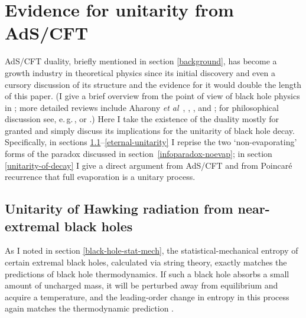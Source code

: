 \documentclass[12pt]{article}
\newcommand{\egc}{\mbox{e.\,g.\,}}
\begin{document}
\section{Evidence for unitarity from AdS/CFT}\label{adscft}

AdS/CFT duality, briefly mentioned in section \ref{background}, has become a growth industry in theoretical physics since its initial discovery and even a cursory discussion of its structure and the evidence for it would double the length of this paper. (I give a brief overview from the point of view of black hole physics in ; more detailed reviews include Aharony \emph{et al}~\citeyear{aharonyadscftreview}, , , and ; for philosophical discussion see, \egc,  or .) Here I take the existence of the duality mostly for granted and simply discuss its implications for the unitarity of black hole decay. Specifically, in sections \ref{near-extremal-unitarity}--\ref{eternal-unitarity} I reprise the two `non-evaporating' forms of the paradox discussed in section~\ref{infoparadox-noevap}; in section \ref{unitarity-of-decay} I give a direct argument from AdS/CFT and from Poincar\'{e} recurrence that full evaporation is a unitary process.

\subsection{Unitarity of Hawking radiation from near-extremal black holes}\label{near-extremal-unitarity}

As I noted in section \ref{black-hole-stat-mech}, the statistical-mechanical entropy of certain extremal black holes, calculated via string theory, exactly matches the predictions of black hole thermodynamics. If such a black hole absorbs a small amount of uncharged mass, it will be perturbed away from equilibrium and acquire a temperature, and the leading-order change in entropy in this process again matches the thermodynamic prediction \cite{horowitzstrominger}. 
\end{document}
